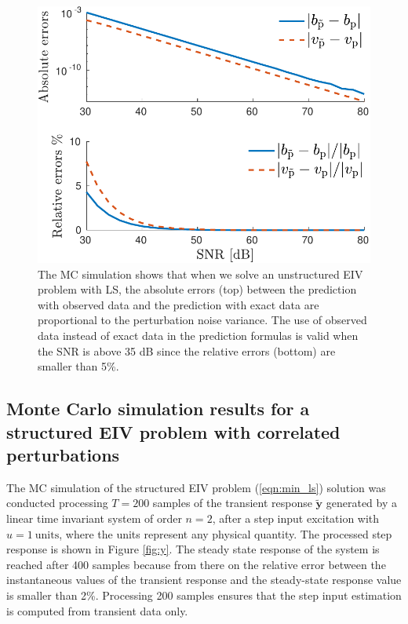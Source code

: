 \begin{figure}[htb!]
  \centering
  \includegraphics[width=1\columnwidth]{./ChapterStatisticalAnalysis/fig/Fig_4.pdf} 
  \caption{ \label{fig:bv_btvt_abse_rele_unstr_e7} The MC simulation shows that when we solve an unstructured EIV problem with LS, the absolute errors (top) between the prediction with observed data and the prediction with exact data are proportional to the perturbation noise variance. The use of observed data instead of exact data in the prediction formulas is valid when the SNR is above 35 dB since the relative errors (bottom) are smaller than 5\%. } 
\end{figure}


\subsection{Monte Carlo simulation results for a structured EIV problem with correlated perturbations}

The MC simulation of the structured EIV problem (\ref{eqn:min_ls}) solution was conducted processing $T = 200$ samples of the transient response $\widetilde{\mathbf{y}}$ generated by a linear time invariant system of order $n = 2$, after a step input excitation with $u = 1 \ \mathrm{units}$, where the units represent any physical quantity. 
The processed step response is shown in Figure \ref{fig:y}.
The steady state response of the system is reached after 400 samples because from there on the relative error between the instantaneous values of the transient response and the steady-state response value is smaller than 2\%.
Processing 200 samples ensures that the step input estimation is computed from transient data only.


